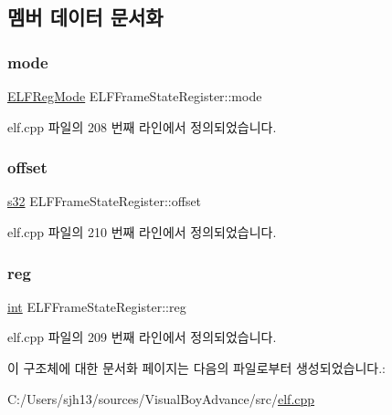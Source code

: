 \subsection{멤버 데이터 문서화}
\mbox{\label{struct_e_l_f_frame_state_register_a985e32a6d582507f95e02e149837498c}} 
\subsubsection{\texorpdfstring{mode}{mode}}
{\footnotesize\ttfamily \mbox{\hyperlink{elf_8cpp_a5d118aeb7ff13ec2fa52230ea4878c22}{E\+L\+F\+Reg\+Mode}} E\+L\+F\+Frame\+State\+Register\+::mode}



elf.\+cpp 파일의 208 번째 라인에서 정의되었습니다.

\mbox{\label{struct_e_l_f_frame_state_register_a6ef710a9432cda4aace7c893717d1a16}} 
\subsubsection{\texorpdfstring{offset}{offset}}
{\footnotesize\ttfamily \mbox{\hyperlink{_system_8h_a0ce6887c26c1c49ad3be5710dd42bfd6}{s32}} E\+L\+F\+Frame\+State\+Register\+::offset}



elf.\+cpp 파일의 210 번째 라인에서 정의되었습니다.

\mbox{\label{struct_e_l_f_frame_state_register_a9c8eebd7a9afe0d48e833e7610b2153a}} 
\subsubsection{\texorpdfstring{reg}{reg}}
{\footnotesize\ttfamily \mbox{\hyperlink{_util_8cpp_a0ef32aa8672df19503a49fab2d0c8071}{int}} E\+L\+F\+Frame\+State\+Register\+::reg}



elf.\+cpp 파일의 209 번째 라인에서 정의되었습니다.



이 구조체에 대한 문서화 페이지는 다음의 파일로부터 생성되었습니다.\+:\begin{DoxyCompactItemize}
\item 
C\+:/\+Users/sjh13/sources/\+Visual\+Boy\+Advance/src/\mbox{\hyperlink{elf_8cpp}{elf.\+cpp}}\end{DoxyCompactItemize}
